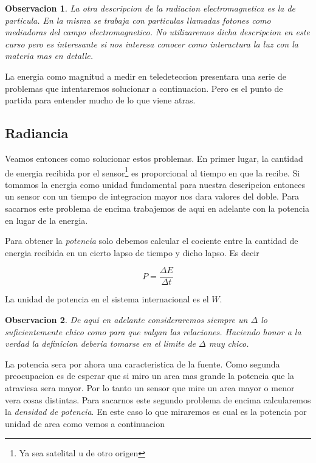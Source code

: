 \documentclass[a4paper,12pt]{article}
\newtheorem*{obs}{Observacion}
\begin{document}
\begin{obs}
  La otra descripcion de la radiacion electromagnetica es la de particula. En la
  misma se trabaja con particulas llamadas \emph{fotones} como mediadoras del
  campo electromagnetico. No utilizaremos dicha descripcion en este curso pero
  es interesante si nos interesa conocer como interactura la luz con la materia
  mas en detalle.
\end{obs}

La energia como magnitud a medir en teledeteccion presentara una serie de
problemas que intentaremos solucionar a continuacion. Pero es el punto de
partida para entender mucho de lo que viene atras.

\subsection{Radiancia}

Veamos entonces como solucionar estos problemas. En primer lugar, la cantidad de
energia recibida por el sensor\footnote{Ya sea satelital u de otro origen} es
proporcional al tiempo en que la recibe. Si tomamos la energia como unidad
fundamental para nuestra descripcion entonces un sensor con un tiempo de
integracion mayor nos dara valores del doble. Para sacarnos este problema de
encima trabajemos de aqui en adelante con la potencia en lugar de la energia.

Para obtener la \emph{potencia} solo debemos calcular el cociente entre la
cantidad de energia recibida en un cierto lapso de tiempo y dicho lapso. Es
decir

\begin{equation}
  P = \frac{\Delta E}{\Delta t}
\end{equation}

La unidad de potencia en el sistema internacional es el $W$.

\begin{obs}
  De aqui en adelante consideraremos siempre un $\Delta$ lo suficientemente chico
  como para que valgan las relaciones. Haciendo honor a la verdad la definicion
  deberia tomarse en el limite de $\Delta$ muy chico.
\end{obs}

La potencia sera por ahora una caracteristica de la fuente. Como segunda
preocupacion es de esperar que si miro un area mas grande la potencia que la
atraviesa sera mayor. Por lo tanto un sensor que mire un area mayor o menor vera
cosas distintas. Para sacarnos este segundo problema de encima calcularemos la
\emph{densidad de potencia}. En este caso lo que miraremos es cual es la
potencia por unidad de area como vemos a continuacion
\end{document}
